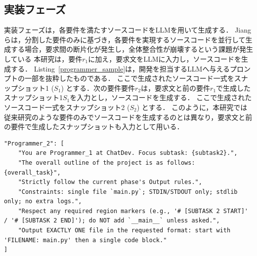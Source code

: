 \documentclass[submit,techrep,noauthor]{ipsj}
\begin{document}

\subsection{実装フェーズ}

実装フェーズは，各要件を満たすソースコードをLLMを用いて生成する．
Jiangらは，分割した要件のみに基づき，各要件を実現するソースコードを並行して生成する場合，要求間の断片化が発生し，全体整合性が崩壊するという課題が発生している\cite{tosem}
本研究は，要件$r_1$に加え，要求文をLLMに入力し，ソースコードを生成する．
Listing~\ref{programmer_sample}は，開発を担当するLLMへ与えるプロンプトの一部を抜粋したものである．
ここで生成されたソースコード一式をスナップショット1 ($S_1$) とする．次の要件要件$r_2$は，要求文と前の要件$r_1$で生成したスナップショット1$S_1$を入力とし，ソースコードを生成する．
ここで生成されたソースコード一式をスナップショット2 ($S_2$) とする．
このように，本研究では従来研究のような要件のみでソースコードを生成するのとは異なり，要求文と前の要件で生成したスナップショットも入力として用いる．

\begin{lstlisting}[caption=実装を行うLLMへ与えるプロンプト例, label=programmer_sample, captionpos=t, columns=fullflexible, breaklines=true]
"Programmer_2": [
    "You are Programmer_1 at ChatDev. Focus subtask: {subtask2}.",
    "The overall outline of the project is as follows: {overall_task}",  
    "Strictly follow the current phase's Output rules.",
    "Constraints: single file `main.py`; STDIN/STDOUT only; stdlib only; no extra logs.",
    "Respect any required region markers (e.g., '# [SUBTASK 2 START]' / '# [SUBTASK 2 END]'); do NOT add `__main__` unless asked.",
    "Output EXACTLY ONE file in the requested format: start with 'FILENAME: main.py' then a single code block."
]
\end{lstlisting}
\end{document}
